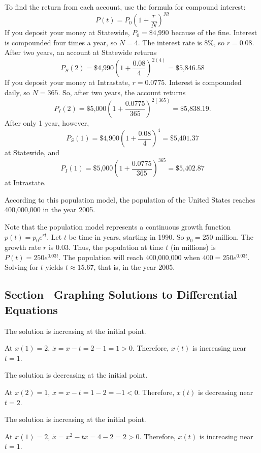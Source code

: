 \documentclass{ximera}
\begin{document}
\soln To find the return from each account, use the formula for
compound interest:
\[
P(t) = P_0\left(1 + \frac{r}{N}\right)^{Nt}
\]
If you deposit your money at Statewide, $P_0 = \$4\mbox{,}990$ because of the
fine.  Interest is compounded four times a year, so $N = 4$.  The interest
rate is 8\%, so $r = 0.08$.
After two years, an account at Statewide returns
\[
P_{S}(2) = \$4\mbox{,}990\left(1 + \frac{0.08}{4}\right)^{2(4)} = 
\$5\mbox{,}846.58
\]
If you deposit your money at Intrastate, $r = 0.0775$.  Interest is
compounded daily, so $N = 365$.  So, after two years, the account returns
\[
P_{I}(2) = \$5\mbox{,}000\left(1 + \frac{0.0775}{365}\right)^{2(365)} = 
\$5\mbox{,}838.19.
\]
After only 1 year, however,
\[
P_{S}(1) = \$4\mbox{,}900\left(1 + \frac{0.08}{4}\right)^{4} = \$5\mbox{,}401.37
\]
at Statewide, and
\[
P_{I}(1) = \$5\mbox{,}000\left(1 + \frac{0.0775}{365}\right)^{365} = 
\$5\mbox{,}402.87
\]
at Intrastate.

\ans According to this population model, the population of the United States
reaches 400,000,000 in the year 2005.

\soln Note that the population model represents a continuous growth
function $p(t) = p_0e^{rt}$.  Let $t$ be time in years, starting in 1990. 
So $p_0 = 250$ million.  The growth rate $r$ is $0.03$.  Thus, the
population at time $t$ (in millions) is $P(t) = 250e^{0.03t}$.
The population will reach 400,000,000 when $400 = 250e^{0.03t}$.
Solving for $t$ yields $t \approx 15.67$, that is, in the year 2005.


\subsection*{Section~\protect{\ref{S:3.2}} Graphing Solutions to Differential
Equations}

 \ans The solution is increasing at the initial point.

\soln At $x(1)=2$, $\dot{x}=x-t=2-1=1>0$.  Therefore, $x(t)$ is increasing
near $t=1$.

 \ans The solution is decreasing at the initial point.

\soln At $x(2)=1$, $\dot{x}=x-t=1-2=-1<0$.  Therefore, $x(t)$ is decreasing
near $t=2$.

 \ans The solution is increasing at the initial point.

\soln At $x(1)=2$, $\dot{x}=x^2-tx=4-2=2>0$.  Therefore, $x(t)$ is increasing
near $t=1$.
\end{document}
